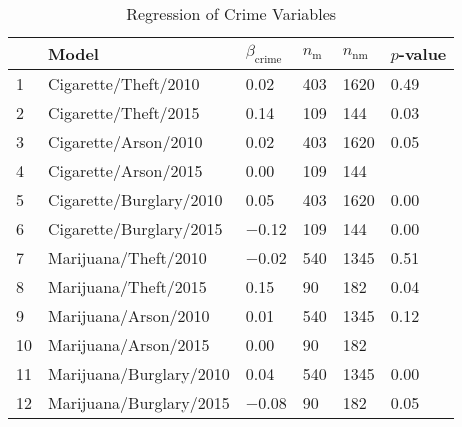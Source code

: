 \begin{table}[ht]
\centering
\begin{tabularx}{\columnwidth}{XlXXXX}
  \hline
 & Model & $\beta_{\text{crime}}$ & $n_{\text{m}}$ & $n_{\text{nm}}$ & $p$-value \\ 
  \hline
1 & Cigarette/Theft/2010 & 0.02 & 403 & 1620 & 0.49 \\ 
  2 & Cigarette/Theft/2015 & 0.14 & 109 & 144 & 0.03 \\ \hline
  3 & Cigarette/Arson/2010 & 0.02 & 403 & 1620 & 0.05 \\ 
  4 & Cigarette/Arson/2015 & 0.00 & 109 & 144 &  \\ \hline
  5 & Cigarette/Burglary/2010 & 0.05 & 403 & 1620 & 0.00 \\ 
  6 & Cigarette/Burglary/2015 & $-$0.12 & 109 & 144 & 0.00 \\ \hline
  7 & Marijuana/Theft/2010 & $-$0.02 & 540 & 1345 & 0.51 \\ 
  8 & Marijuana/Theft/2015 & 0.15 &  90 & 182 & 0.04 \\ \hline
  9 & Marijuana/Arson/2010 & 0.01 & 540 & 1345 & 0.12 \\ 
  10 & Marijuana/Arson/2015 & 0.00 &  90 & 182 &  \\ \hline
  11 & Marijuana/Burglary/2010 & 0.04 & 540 & 1345 & 0.00 \\ 
  12 & Marijuana/Burglary/2015 & $-$0.08 &  90 & 182 & 0.05 \\ 
   \hline
\end{tabularx}
\caption{Regression of Crime Variables} 
\end{table}

